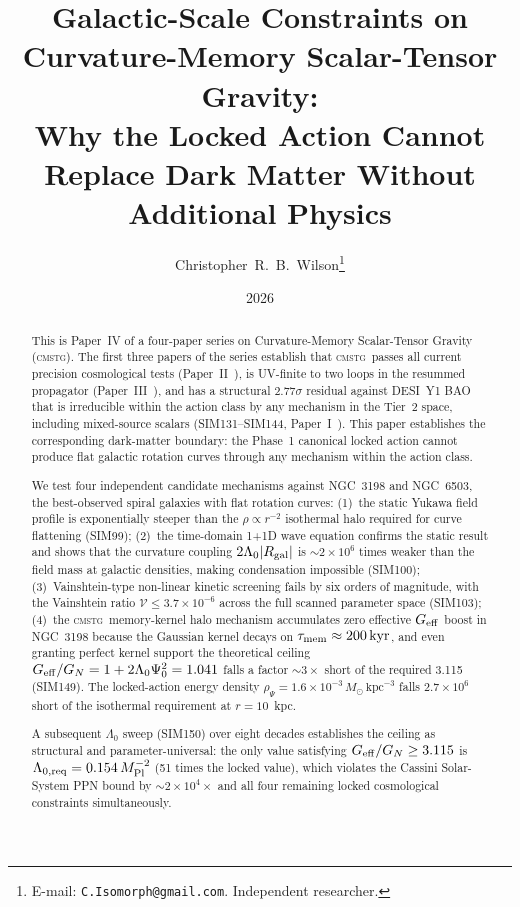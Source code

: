 \documentclass[12pt,a4paper]{article}
\title{\textbf{Galactic-Scale Constraints on Curvature-Memory Scalar-Tensor Gravity:\\
       Why the Locked Action Cannot Replace Dark Matter Without Additional Physics}}
\author{Christopher~R.~B.~Wilson\thanks{E-mail: \texttt{C.Isomorph@gmail.com}. Independent researcher.}}
\date{2026}
\newcommand{\CMSTG}{\textsc{cmstg}}
\newcommand{\Lz}{\Lambda_0}
\newcommand{\Mpl}{M_{\rm Pl}}
\newcommand{\Geff}{G_{\rm eff}}
\theoremstyle{plain}
\begin{document}
\maketitle

\begin{abstract}
This is Paper~IV of a four-paper series on Curvature-Memory Scalar-Tensor
Gravity (\CMSTG). The first three papers of the series establish that \CMSTG\
passes all current precision cosmological tests (Paper~II~\cite{WilsonPaperII}),
is UV-finite to two loops in the resummed propagator
(Paper~III~\cite{WilsonPaperIII}), and has a structural $2.77\sigma$ residual
against DESI~Y1 BAO that is irreducible within the action class by any mechanism
in the Tier~2 space, including mixed-source scalars (SIM131--SIM144,
Paper~I~\cite{WilsonPaperI}). This paper establishes the
corresponding dark-matter boundary: the Phase~1 canonical locked action cannot
produce flat galactic rotation curves through any mechanism within the action
class.

We test four independent candidate mechanisms against NGC~3198 and NGC~6503,
the best-observed spiral galaxies with flat rotation curves: (1)~the static
Yukawa field profile is exponentially steeper than the $\rho \propto r^{-2}$
isothermal halo required for curve flattening (SIM99); (2)~the time-domain
1+1D wave equation confirms the static result and shows that the curvature
coupling $2\Lz|R_{\rm gal}|$ is $\sim2\times10^6$ times weaker than the field
mass at galactic densities, making condensation impossible (SIM100); (3)~Vainshtein-type
non-linear kinetic screening fails by six orders of magnitude, with the
Vainshtein ratio $\mathcal{V} \leq 3.7\times10^{-6}$ across the full scanned
parameter space (SIM103); (4)~the \CMSTG\ memory-kernel halo mechanism
accumulates zero effective $\Geff$ boost in NGC~3198 because the Gaussian
kernel decays on $\tau_{\rm mem}\approx200\,\mathrm{kyr}$, and even granting
perfect kernel support the theoretical ceiling $\Geff/G_N = 1 + 2\Lz\Psi_0^2
= 1.041$ falls a factor $\sim3\times$ short of the required 3.115 (SIM149). The
locked-action energy density $\rho_\Psi = 1.6\times10^{-3}\,M_\odot\,\mathrm{kpc}^{-3}$
falls $2.7\times10^6$ short of the isothermal requirement at $r = 10$~kpc.

A subsequent $\Lz$ sweep (SIM150) over eight decades establishes the ceiling as
structural and parameter-universal: the only value satisfying $\Geff/G_N \geq 3.115$
is $\Lambda_{0,{\rm req}} = 0.154\,\Mpl^{-2}$ (51 times the locked value), which
violates the Cassini Solar-System PPN bound by $\sim2\times10^4\times$ and all four
remaining locked cosmological constraints simultaneously.


\end{abstract}
\end{document}
